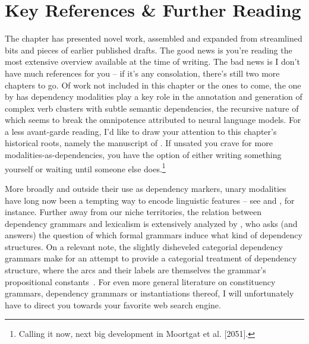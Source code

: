 \section{Key References \& Further Reading}
The chapter has presented novel work, assembled and expanded from streamlined bits and pieces of earlier published drafts.
The good news is you're reading the most extensive overview available at the time of writing.
The bad news is I don't have much references for you -- if it's any consolation, there's still two more chapters to go.
Of work not included in this chapter or the ones to come, the one by \citet{rouss} has dependency modalities play a key role in the annotation and generation of complex verb clusters with subtle semantic dependencies, the recursive nature of which seems to break the omnipotence attributed to neural language models.
For a less avant-garde reading, I'd like to draw your attention to this chapter's historical roots, namely the manuscript of \citet{moortgat1991heads}.
If unsated you crave for more modalities-as-dependencies, you have the option of either writing something yourself or waiting until someone else does.\footnote{Calling it now, next big development in Moortgat et al. [2051].}

More broadly and outside their use as dependency markers, unary modalities have long now been a tempting way to encode linguistic features -- see \citet{moa} and \citet{10.7551/mitpress/6169.003.0012,johnson1999resource}, for instance.
Further away from our niche territories, the relation between dependency grammars and lexicalism is extensively analyzed by \citet{kuhlmann2010dependency}, who asks (and answers) the question of which formal grammars induce what kind of dependency structures.
On a relevant note, the slightly disheveled categorial dependency grammars make for an attempt to provide a categorial treatment of dependency structure, where the arcs and their labels are themselves the grammar's propositional constants~\cite{dekhtyar2015categorial}.
For even more general literature on constituency grammars, dependency grammars or instantiations thereof, I will unfortunately have to direct you towards your favorite web search engine.


